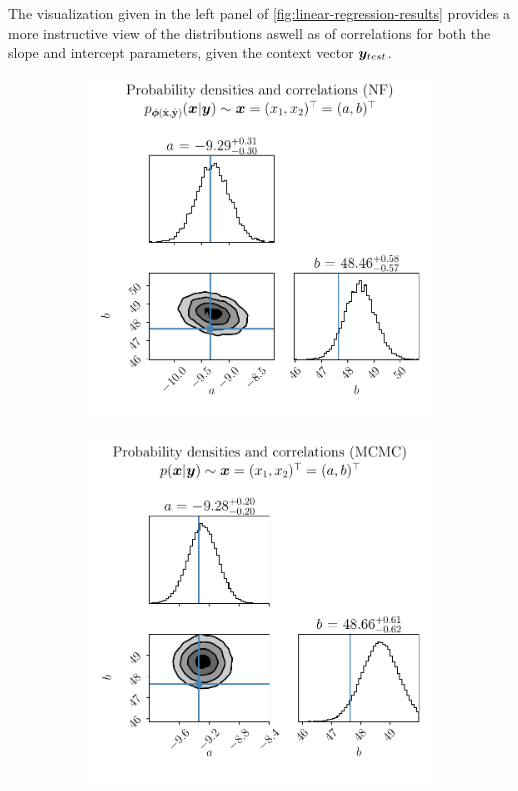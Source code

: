\documentclass[a4paper,12pt]{report}
\begin{document}
The visualization given in the left panel of  \cref{fig:linear-regression-results} provides a more instructive view of the distributions aswell as of correlations for both the slope and intercept parameters, given the context vector $\bm{y}_{test}$.
\begin{figure}[h]
	\centering
	\begin{subfigure}[t]{0.49\textwidth}
	\centering
	\includegraphics[width=\textwidth]{figures/nf-linear-regression-example-corner.pdf}
	\end{subfigure}
	\hfill
	\begin{subfigure}[t]{0.49\textwidth}
	\centering
	\includegraphics[width=\textwidth]{figures/nf-linear-regression-example-corner-mcmc.pdf}

\end{subfigure}
\end{figure}
\end{document}
